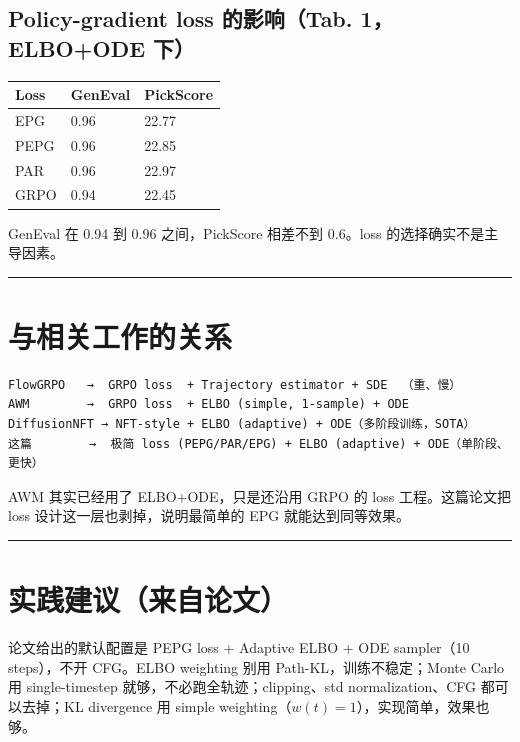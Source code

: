 \subsection{Policy-gradient loss 的影响（Tab. 1，ELBO+ODE 下）}

\begin{center}
\begin{tabular}{lll}
\toprule
Loss & GenEval & PickScore \\
\midrule
EPG & 0.96 & 22.77 \\
PEPG & 0.96 & 22.85 \\
PAR & 0.96 & 22.97 \\
GRPO & 0.94 & 22.45 \\
\bottomrule
\end{tabular}
\end{center}

GenEval 在 0.94 到 0.96 之间，PickScore 相差不到 0.6。loss 的选择确实不是主导因素。

\hrule

\section{与相关工作的关系}

\begin{verbatim}
FlowGRPO   →  GRPO loss  + Trajectory estimator + SDE  （重、慢）
AWM        →  GRPO loss  + ELBO (simple, 1-sample) + ODE  
DiffusionNFT → NFT-style + ELBO (adaptive) + ODE（多阶段训练，SOTA）
这篇        →  极简 loss (PEPG/PAR/EPG) + ELBO (adaptive) + ODE（单阶段、更快）
\end{verbatim}

AWM 其实已经用了 ELBO+ODE，只是还沿用 GRPO 的 loss 工程。这篇论文把 loss 设计这一层也剥掉，说明最简单的 EPG 就能达到同等效果。

\hrule

\section{实践建议（来自论文）}

论文给出的默认配置是 PEPG loss + Adaptive ELBO + ODE sampler（10 steps），不开 CFG。ELBO weighting 别用 Path-KL，训练不稳定；Monte Carlo 用 single-timestep 就够，不必跑全轨迹；clipping、std normalization、CFG 都可以去掉；KL divergence 用 simple weighting（\(w(t)=1\)），实现简单，效果也够。
